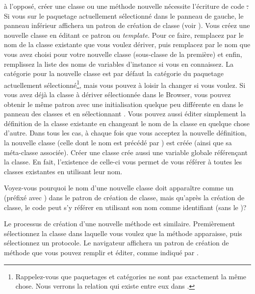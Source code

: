 \documentclass[a4paper,10pt,twoside]{book}
\begin{document}
à l'opposé, créer une classe ou une méthode nouvelle nécessite 
l'écriture de code \st.
Si vous \clickz sur le paquetage actuellement sélectionné dans le
panneau de gauche, le panneau inférieur affichera un patron de création de classe
(voir ).
Vous créez une nouvelle classe en éditant ce patron ou \emph{template}. 
Pour ce faire, remplacez  par le nom de la classe existante
que vous voulez dériver, puis remplacez  par le nom
que vous avez choisi pour votre nouvelle classe (sous-classe de la première) 
et enfin, remplissez la liste des noms de variables d'instance si vous en connaissez.  
La catégorie pour la nouvelle classe est par défaut la
catégorie du paquetage actuellement sélectionné\footnote{Rappelez-vous que paquetages et catégories ne sont pas exactement la même chose. 
Nous verrons la relation qui existe entre eux dans .}, 
mais vous pouvez à loisir la changer si vous voulez.
Si vous avez déjà la classe à dériver sélectionnée dans 
le Browser, vous pouvez obtenir le même patron avec une initialisation
quelque peu différente en \actclickant dans le panneau des classes et en sélectionnant 
.
Vous pouvez aussi éditer simplement la définition de la classe existante en changeant 
le nom de la classe en quelque chose d'autre.
Dans tous les cas, à chaque fois que vous acceptez la nouvelle définition, la nouvelle classe 
(celle dont le nom est précédé par \ct{#}) est créée (ainsi que sa méta-classe associée).  
Créer une classe crée aussi une variable globale référençant
la classe. En fait, l'existence de celle-ci vous permet de vous 
référer à toutes les classes existantes en utilisant leur nom.

Voyez-vous pourquoi le nom d'une nouvelle classe doit apparaître
comme un  (\ie préfixé avec \ct{#}) dans le
patron de création de classe, mais qu'après la création
de classe, le code peut s'y référer en utilisant
son nom comme identifiant (\ie sans le \ct{#})?

Le processus de création d'une nouvelle méthode
est similaire. Premièrement sélectionnez la classe dans laquelle vous
voulez que la méthode apparaisse, puis sélectionnez un protocole.
Le navigateur affichera un patron de création de méthode que
vous pouvez remplir et éditer, comme indiqué par
.
\end{document}
